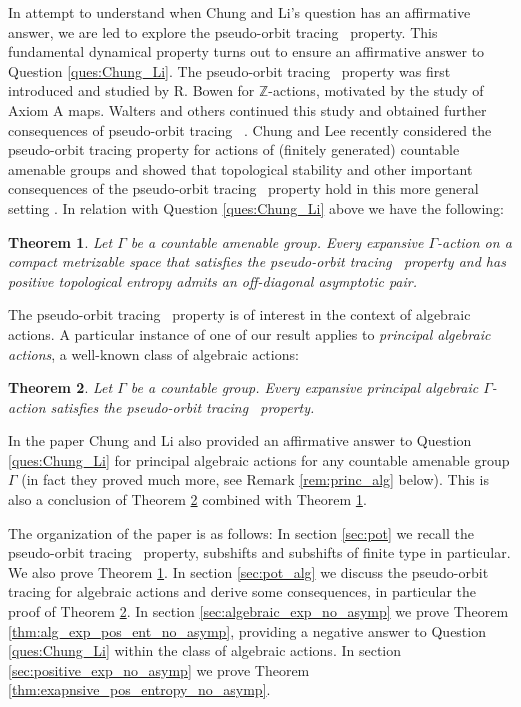 \documentclass[oneside,english]{amsart}
\newtheorem{thm}{Theorem}[section]
\theoremstyle{definition}
\newcommand{\Act}[2]{\mathit{Act}({#1},{#2})}
\newcommand{\POT}{pseudo-orbit tracing}
\begin{document}
In attempt to understand when Chung and Li's question has an affirmative answer, we are led to  explore the \POT~ property. This fundamental dynamical property turns out to  ensure an affirmative answer to Question \ref{ques:Chung_Li}.
The \POT~ property was first introduced and studied by R. Bowen \cite{MR0482842} for $\mathbb{Z}$-actions, motivated by the study of Axiom A maps.
Walters and others continued this study and obtained further consequences of \POT~  \cite{MR518563}.
Chung and Lee recently considered the pseudo-orbit tracing property for actions of (finitely generated) countable amenable groups and showed that topological stability and other important consequences of  the \POT~ property  hold  in this more general setting \cite{1611.08994}.
In relation with Question \ref{ques:Chung_Li} above we have the following:

\begin{thm}\label{prop:finite_type_entropy_off_diagonal}
Let $\Gamma$ be a countable amenable group.  %
Every expansive $\Gamma$-action on a compact  metrizable  space that satisfies the \POT~ property and has positive topological entropy admits an off-diagonal  asymptotic pair. %
\end{thm}

The \POT~ property is of interest in the context of algebraic actions.
A particular instance of one of our result applies to \emph{principal algebraic actions}, a well-known class of algebraic actions:
\begin{thm}\label{thm:priniciple_alg_pot}
Let $\Gamma$ be a countable group. Every expansive principal algebraic $\Gamma$-action satisfies the \POT~ property.
\end{thm}

In the paper \cite{MR3314515} Chung and Li also provided an  affirmative answer to Question \ref{ques:Chung_Li} for principal algebraic actions for any countable amenable group $\Gamma$ (in fact they proved much more, see Remark \ref{rem:princ_alg} below).
This is also a  conclusion of Theorem \ref{thm:priniciple_alg_pot} combined with Theorem \ref{prop:finite_type_entropy_off_diagonal}.

The organization of the paper is as follows: In section \ref{sec:pot} we recall the \POT~ property, subshifts and subshifts of finite type in particular. We also prove Theorem \ref{prop:finite_type_entropy_off_diagonal}. In section \ref{sec:pot_alg} we discuss the pseudo-orbit tracing for algebraic actions and derive some consequences, in particular the proof of  Theorem \ref{thm:priniciple_alg_pot}. In section \ref{sec:algebraic_exp_no_asymp}
 we prove Theorem \ref{thm:alg_exp_pos_ent_no_asymp}, providing a negative answer to Question \ref{ques:Chung_Li} within the class of algebraic actions. In section \ref{sec:positive_exp_no_asymp}
we prove Theorem \ref{thm:exapnsive_pos_entropy_no_asymp}.
\end{document}
